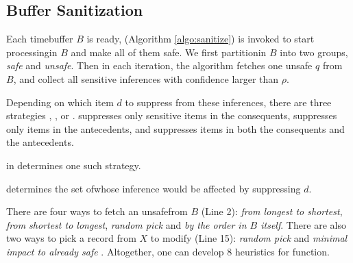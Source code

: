 \subsection{Buffer Sanitization}
\label{sec:sanitize}

Each time\qid buffer $B$ is ready, \SanitizeBuffer (Algorithm \ref{algo:sanitize})
is invoked to start processing\qids in $B$ and make all of them safe.
We first partition\qids in $B$ into two groups, {\em safe} and {\em unsafe}.
Then in each iteration, the algorithm fetches one unsafe $q$ from $B$,
and collect all sensitive inferences with confidence larger than $\rho$.

Depending on which item $d$ to suppress from these inferences, there are three strategies \PartialR, \PartialL, or \PartialALL.
\PartialR suppresses only sensitive items in the consequents,
\PartialL suppresses only items in the antecedents,
and \PartialALL suppresses items in both the consequents and the antecedents.

\SuppressionPolicy in \SanitizeBuffer determines one such strategy.

\UpdateBuffer determines the set of\qids whose inference would
be affected by suppressing $d$.

There are four ways to fetch an unsafe\qid from $B$ (Line 2):
{\em from longest to shortest}, {\em from shortest to longest}, {\em
random pick} and {\em by the order in $B$ itself}.
There are also two ways to pick a record from $X$ to modify (Line 15):
{\em random pick} and {\em minimal impact to already safe \qidsx}.
Altogether, one can develop 8 heuristics for \SanitizeBuffer function.


